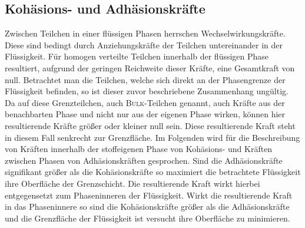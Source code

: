 \subsection*{Kohäsions- und Adhäsionskräfte}
Zwischen Teilchen in einer flüssigen Phasen herrschen Wechselwirkungskräfte. Diese sind bedingt durch Anziehungskräfte der Teilchen untereinander in der Flüssigkeit. Für homogen verteilte Teilchen innerhalb der flüssigen Phase resultiert, aufgrund der geringen Reichweite dieser Kräfte, eine Gesamtkraft von null. Betrachtet man die Teilchen, welche sich direkt an der Phasengrenze der Flüssigkeit befinden, so ist dieser zuvor beschriebene Zusammenhang ungültig. Da auf diese Grenzteilchen, auch \textsc{Bulk}-Teilchen genannt, auch Kräfte aus der benachbarten Phase und nicht nur aus der eigenen Phase wirken, können hier resultierende Kräfte größer  oder kleiner null sein. Diese resultierende Kraft steht in diesem Fall senkrecht zur Grenzfläche.\linebreak
Im Folgenden wird für die Beschreibung von Kräften innerhalb der stoffeigenen Phase von Kohäsions- und Kräften zwischen Phasen von Adhäsionskräften gesprochen. Sind die Adhäsionskräfte signifikant größer als die Kohäsionskräfte so maximiert die betrachtete Flüssigkeit ihre Oberfläche der Grenzschicht. Die resultierende Kraft wirkt hierbei entgegensetzt zum Phaseninneren der Flüssigkeit. Wirkt die resultierende Kraft in das Phaseninnere so sind die Kohäsionskräfte größer als die Adhäsionskräfte und die Grenzfläche der Flüssigkeit ist versucht ihre Oberfläche zu minimieren.

